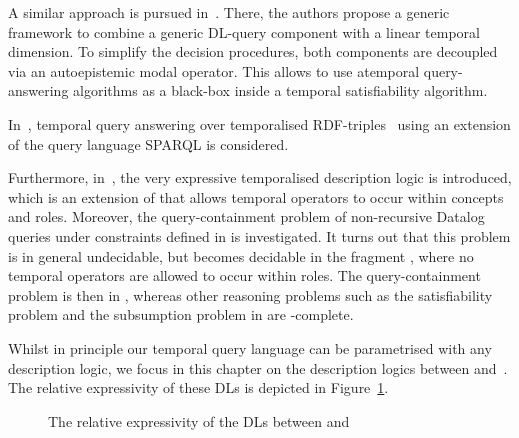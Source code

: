 A similar approach is pursued in~\cite{GuKl-RR12}.  There, the authors propose a
generic framework to combine a generic DL-query component with a linear temporal
dimension.  To simplify the decision procedures, both components are decoupled
via an autoepistemic modal operator.  This allows to use atemporal
query-answering algorithms as a black-box inside a temporal satisfiability
algorithm.

In~\cite{Mot-JWS12}, temporal query answering over temporalised
RDF-triples~\cite{GuHV-ESWC05} using an extension of the query language SPARQL
is considered.

Furthermore, in~\cite{AFW+-JELIA02}, the very expressive temporalised
description logic \DLRUS is introduced, which is an extension of \DLR that
allows temporal operators to occur within concepts and roles.  Moreover, the
query-containment problem of non-recursive Datalog queries under constraints
defined in \DLRUS is investigated.  It turns out that this problem is in general
undecidable, but becomes decidable in the fragment \DLRUSminus, where no
temporal operators are allowed to occur within roles.  The query-containment
problem is then in \TwoExpTime, whereas other reasoning problems such as the
satisfiability problem and the subsumption problem in \DLRUSminus are
\ExpSpace-complete.

Whilst in principle our temporal query language can be parametrised with any
description logic, we focus in this chapter on the description logics between
\ALC and~\SHQ.  The relative expressivity of these DLs is depicted in
Figure~\ref{fig:alc-shq}.

\begin{figure}[t]
    \centering
    \caption{The relative expressivity of the DLs between \ALC and~\SHQ}
    \label{fig:alc-shq}
\end{figure}

